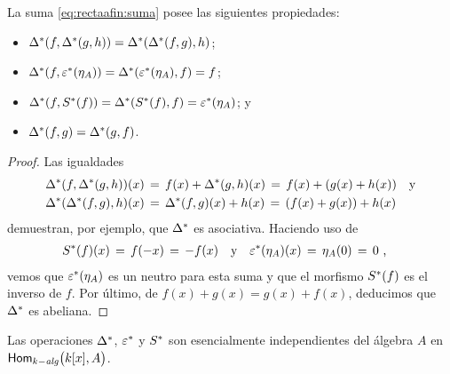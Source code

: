 \begin{propoRectaAfin}\label{propo:rectaafin:suma}
	La suma \eqref{eq:rectaafin:suma} posee las siguientes propiedades:
	\begin{itemize}
		\item
			\begin{math}
				{\Delta}^{*}(f,{\Delta}^{*}(g,h))=
					{\Delta}^{*}({\Delta}^{*}(f,g),h)
			\end{math};
		\item
			\begin{math}
				{\Delta}^{*}(f,{\varepsilon}^{*}(\eta_A))=
					{\Delta}^{*}({\varepsilon}^{*}(\eta_A),f)
					=f
			\end{math};
		\item
			\begin{math}
				{\Delta}^{*}(f,{S}^{*}(f))=
					{\Delta}^{*}({S}^{*}(f),f)=
					{\varepsilon}^{*}(\eta_A)
			\end{math}; y
		\item
			\begin{math}
				{\Delta}^{*}(f,g)={\Delta}^{*}(g,f)
			\end{math}.
	\end{itemize}
\end{propoRectaAfin}

\begin{proof}
	Las igualdades
	\begin{align*}
		{\Delta}^{*}(f,{\Delta}^{*}(g,h))(x) & \,=\,
			f(x)+{\Delta}^{*}(g,h)(x)\,=\,f(x)+(g(x)+h(x))
			\quad\text{y} \\
		{\Delta}^{*}({\Delta}^{*}(f,g),h)(x) & \,=\,
			{\Delta}^{*}(f,g)(x)+h(x)\,=\,(f(x)+g(x))+h(x)
	\end{align*}
	demuestran, por ejemplo, que ${\Delta}^{*}$ es asociativa. Haciendo uso
	de
	\begin{align*}
		{S}^{*}(f)(x) \,=\,f(-x)\,=\,-f(x)
			& \quad\text{y}\quad
			{\varepsilon}^{*}(\eta_A)(x) \,=\,\eta_A(0)\,=\,0
		\text{ ,}
	\end{align*}
	vemos que ${\varepsilon}^{*}(\eta_A)$ es un neutro para esta suma y que
	el morfismo ${S}^{*}(f)$ es el inverso de $f$. Por \'{u}ltimo, de
	$f(x)+g(x)=g(x)+f(x)$, deducimos que ${\Delta}^{*}$ es abeliana.
\end{proof}

Las operaciones ${\Delta}^{*}$, ${\varepsilon}^{*}$ y ${S}^{*}$ son esencialmente
independientes del \'{a}lgebra $A$ en $\mathsf{Hom}_{k-\mathit{alg}}\big(k[x],A\big)$.

